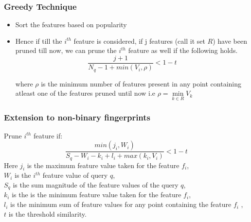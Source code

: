 \documentclass{beamer}
\begin{document}
\begin{frame}
\frametitle{Greedy Technique}

\begin{itemize}
	\item<1-> Sort the features based on popularity
	\item<2-> Hence if till the $i^{th}$ feature is considered, if j features (call it set $R$) have been pruned till now, we can prune the $i^{th}$ feature as well if the following holds.
	\begin{equation}
	\label{eq: greedy}
	\frac{j+1}{N_q - 1 + min(V_{i}, \rho)} < 1-t 
	\end{equation}
	
where 	$\rho$ is the minimum  number of features present in any point containing atleast one of the features pruned until now i.e $\rho = \min\limits_{k\in R} V_k$ 

\end{itemize}
\end{frame}

\begin{frame}
\frametitle{Extension to non-binary fingerprints}
Prune $i^{th}$ feature if:
\begin{equation}
\label{eq:boun3}
\frac{min(j_i,W_i)}{S_q - W_i -k_i+ l_i + max (k_i, V_i)}  < 1-t
\end{equation}
Here $j_i$ is the maximum feature value taken for the feature $f_i$,\\  $W_i$ is the $i^{th}$ feature value of query $q$,  \\$S_q$ is the sum magnitude of the feature values of the query $q$, \\ $k_i$ is the is the minimum feature value taken for the feature $f_i$,\\  $l_i$ is the minimum sum of feature values for any point containing the feature $f_i$ , \\ $t$ is the threshold similarity.
\end{frame}
\end{document}
